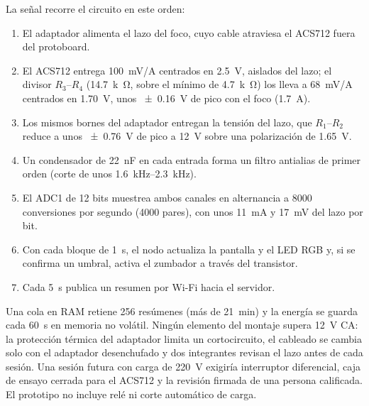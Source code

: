 La señal recorre el circuito en este orden:
\begin{enumerate}
  \item El adaptador alimenta el lazo del foco, cuyo cable atraviesa el ACS712 fuera del protoboard.
  \item El ACS712 entrega \SI{100}{mV/A} centrados en \SI{2,5}{V}, aislados del lazo; el divisor $R_3$--$R_4$ (\SI{14,7}{k\ohm}, sobre el mínimo de \SI{4,7}{k\ohm}) los lleva a \SI{68}{mV/A} centrados en \SI{1,70}{V}, unos \SI{\pm 0,16}{V} de pico con el foco (\SI{1,7}{A}).
  \item Los mismos bornes del adaptador entregan la tensión del lazo, que $R_1$--$R_2$ reduce a unos \SI{\pm 0,76}{V} de pico a \SI{12}{V} sobre una polarización de \SI{1,65}{V}.
  \item Un condensador de \SI{22}{nF} en cada entrada forma un filtro antialias de primer orden (corte de unos \SIrange{1,6}{2,3}{kHz}).
  \item El ADC1 de 12 bits muestrea ambos canales en alternancia a \num{8000} conversiones por segundo (\num{4000} pares), con unos \SI{11}{mA} y \SI{17}{mV} del lazo por bit.
  \item Con cada bloque de \SI{1}{s}, el nodo actualiza la pantalla y el LED RGB y, si se confirma un umbral, activa el zumbador a través del transistor.
  \item Cada \SI{5}{s} publica un resumen por Wi-Fi hacia el servidor.
\end{enumerate}
Una cola en RAM retiene \num{256} resúmenes (más de \SI{21}{min}) y la energía se guarda cada \SI{60}{s} en memoria no volátil.
Ningún elemento del montaje supera \SI{12}{V} CA: la protección térmica del adaptador limita un cortocircuito, el cableado se cambia solo con el adaptador desenchufado y dos integrantes revisan el lazo antes de cada sesión.
Una sesión futura con carga de \SI{220}{V} exigiría interruptor diferencial, caja de ensayo cerrada para el ACS712 y la revisión firmada de una persona calificada.
El prototipo no incluye relé ni corte automático de carga.

